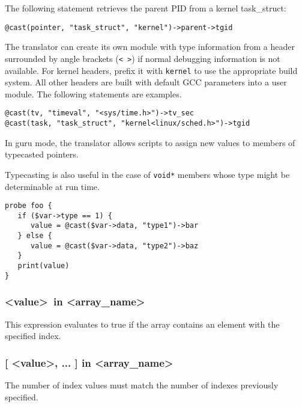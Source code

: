 \documentclass[twoside,english]{article}
\newenvironment{vindent}
{\begin{list}{}{\setlength{\listparindent}{6pt}}
\item[]}
{\end{list}}
\begin{document}
The following statement retrieves the parent PID from a kernel
task\_struct:
\begin{vindent}
\begin{verbatim}
@cast(pointer, "task_struct", "kernel")->parent->tgid
\end{verbatim}
\end{vindent}

The translator can create its own module with type information from a
header surrounded by angle brackets (\texttt{< >}) if normal debugging
information is not available.  For kernel headers, prefix it with
\texttt{kernel} to use the appropriate build system.  All other
headers are built with default GCC parameters into a user module. The
following statements are examples.
\begin{vindent}
\begin{verbatim}
@cast(tv, "timeval", "<sys/time.h>")->tv_sec
@cast(task, "task_struct", "kernel<linux/sched.h>")->tgid
\end{verbatim}
\end{vindent}

In guru mode, the translator allows scripts to assign new values to
members of typecasted pointers.

Typecasting is also useful in the case of \texttt{void*} members whose
type might be determinable at run time.
\begin{vindent}
\begin{verbatim}
probe foo {
   if ($var->type == 1) {
      value = @cast($var->data, "type1")->bar
   } else {
      value = @cast($var->data, "type2")->baz
   }
   print(value)
}
\end{verbatim}
\end{vindent}


\subsubsection{\textless value\textgreater\ in \textless array\_name\textgreater}
This expression evaluates to true if the array contains an element with the
specified index.


\subsubsection{{[} \textless value\textgreater, ... ] in \textless array\_name\textgreater}

The number of index values must match the number of indexes previously specified.
\end{document}
